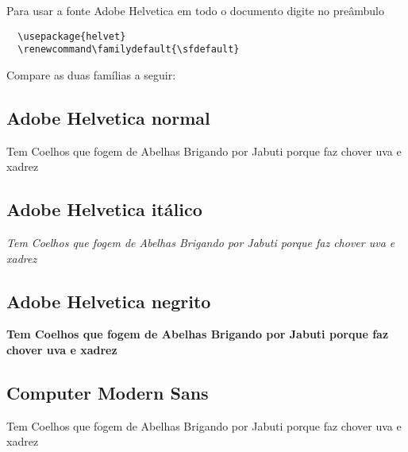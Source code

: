 \documentclass[a4paper]{article}
\newcommand{\frase}{Tem Coelhos que fogem de Abelhas Brigando por Jabuti porque faz chover uva e xadrez}
\renewcommand\familydefault{\sfdefault}
\begin{document}
Para usar a fonte Adobe Helvetica em todo o documento digite no preâmbulo

\begin{verbatim}
  \usepackage{helvet}
  \renewcommand\familydefault{\sfdefault}
\end{verbatim}


Compare as duas famílias a seguir:

\subsection*{Adobe Helvetica normal}
\frase

\subsection*{Adobe Helvetica itálico}
\textit{\frase}

\subsection*{Adobe Helvetica negrito}
\textbf{\frase}

\subsection*{Computer Modern Sans}
{\selectfont
\frase}
\end{document}
